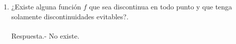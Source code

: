 \begin{enumerate}[\bfseries 1.]
\begin{enumerate}[\bfseries (a)]
    \item ¿Existe alguna función $f$ que sea discontinua en todo punto y que tenga solamente discontinuidades evitables?.\\\\
	Respuesta.-\; No existe.\\\\

\end{enumerate}

\end{enumerate}
